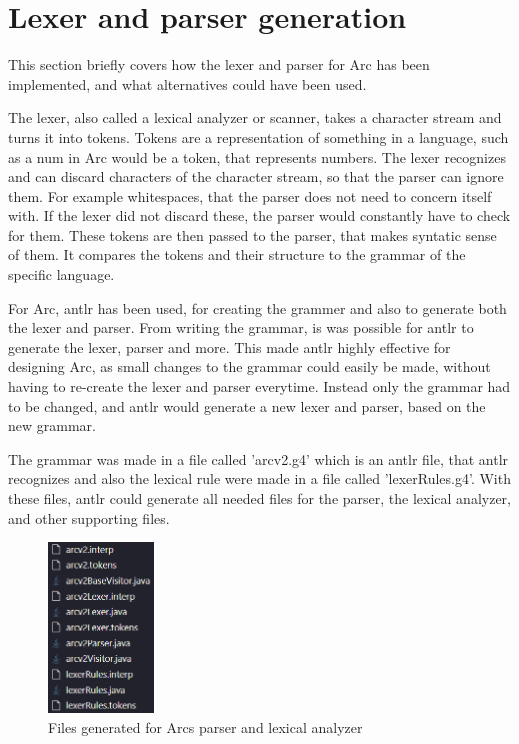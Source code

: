 \section{Lexer and parser generation}\label{sec:lexerandparsergen}
This section briefly covers how the lexer and parser for Arc has been implemented, and what alternatives could have been used.

The lexer, also called a lexical analyzer or scanner, takes a character stream and turns it into tokens. Tokens are a representation of something in a language, such as a num in Arc would be a token, that represents numbers. The lexer recognizes and can discard characters of the character stream, so that the parser can ignore them. For example whitespaces, that the parser does not need to concern itself with. If the lexer did not discard these, the parser would constantly have to check for them. These tokens are then passed to the parser, that makes syntatic sense of them. It compares the tokens and their structure to the grammar of the specific language.\cite{Parr2014}

For Arc, \gls{antlr} has been used, for creating the grammer and also to generate both the lexer and parser. From writing the grammar, is was possible for \gls{antlr} to generate the lexer, parser and more.\cite{Parr2014} This made \gls{antlr} highly effective for designing Arc, as small changes to the grammar could easily be made, without having to re-create the lexer and parser everytime. Instead only the grammar had to be changed, and \gls{antlr} would generate a new lexer and parser, based on the new grammar.

The grammar was made in a file called 'arcv2.g4' which is an \gls{antlr} file, that \gls{antlr} recognizes and also the lexical rule were made in a file called 'lexerRules.g4'. With these files, \gls{antlr} could generate all needed files for the parser, the lexical analyzer, and other supporting files.


\begin{figure}[htb!]
    \begin{center}
        \includegraphics[width=0.25\textwidth]{figures/lexerAndParserFiles.png}
        \caption{Files generated for Arcs parser and lexical analyzer}
        \label{fig:lexerandparserfiles}
    \end{center}
\end{figure}


